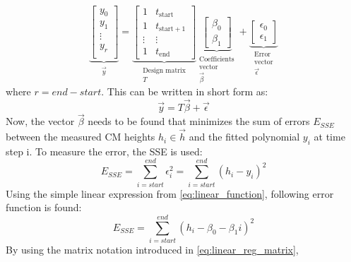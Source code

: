 \begin{equation}\label{eq:linear_reg_matrix}
    \underbrace{
    \begin{bmatrix}
        y_0\\
        y_1\\
        \vdots\\
        y_r\\
    \end{bmatrix}}_{\substack{\vec{y}}}
    =
    \underbrace{
    \begin{bmatrix}
        1 & t_{\text{start}}\\
        1 & t_{\text{start} + 1}\\
        \vdots & \vdots\\
        1 & t_{\text{end}}
    \end{bmatrix}}_{\substack{\text{Design matrix} \\ T}}
    \underbrace{
    \begin{bmatrix}
        \beta_0\\
        \beta_1
    \end{bmatrix}}_{\substack{\text{Coefficients} \\ \text{vector} \\
    \vec{\beta}}}
    +
    \underbrace{
    \begin{bmatrix}
        \epsilon_0\\
        \epsilon_1
    \end{bmatrix}}_{\substack{\text{Error} \\ \text{vector} \\
    \vec{\epsilon}}}
\end{equation}
where $r = end - start$.
This can be written in short form as:
\[
    \vec{y} = T\vec{\beta} + \vec{\epsilon}    
\]
Now, the vector $\vec{\beta}$ needs to be found that minimizes the sum of
errors $E_{SSE}$ between the measured \ac{CM} heights $h_i \in \vec{h}$ and
the fitted polynomial $y_i$ at time step i.
To measure the error, the \ac{SSE} is used:
\begin{equation}
    E_{SSE} = \sum_{i=start}^{end} \epsilon_i^2 = \sum_{i=start}^{end} (h_i - y_i)^2
\end{equation}
Using the simple linear expression from \autoref{eq:linear_function},
following error function is found:
\begin{equation}
    E_{SSE} = \sum_{i=start}^{end} (h_i - \beta_0 - \beta_1i)^2
\end{equation}
By using the matrix notation introduced in \autoref{eq:linear_reg_matrix},
